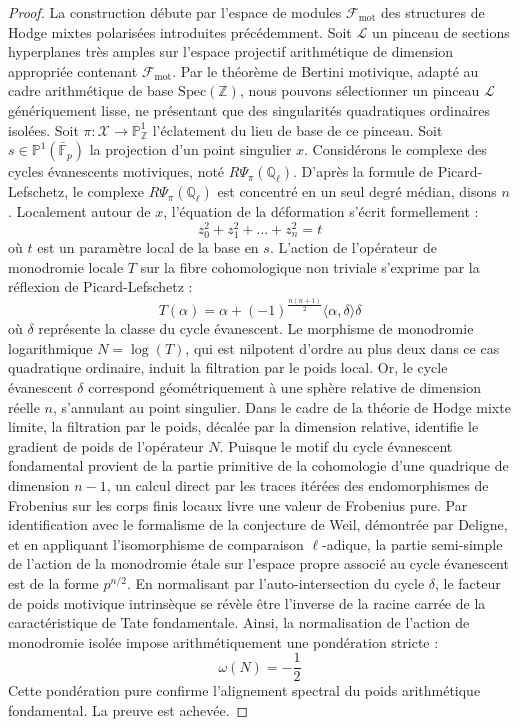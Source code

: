 \documentclass[
]{article}
\begin{document}
\begin{proof}
La construction débute par l'espace de modules $\mathcal{F}_{\mathrm{mot}}$ des structures de Hodge mixtes polarisées introduites précédemment.
Soit $\mathcal{L}$ un pinceau de sections hyperplanes très amples sur l'espace projectif arithmétique de dimension appropriée contenant $\mathcal{F}_{\mathrm{mot}}$.
Par le théorème de Bertini motivique, adapté au cadre arithmétique de base $\mathrm{Spec}(\mathbb{Z})$, nous pouvons sélectionner un pinceau $\mathcal{L}$ génériquement lisse, ne présentant que des singularités quadratiques ordinaires isolées.
Soit $\pi : \mathcal{X} \to \mathbb{P}^1_{\mathbb{Z}}$ l'éclatement du lieu de base de ce pinceau.
Soit $s \in \mathbb{P}^1(\bar{\mathbb{F}}_p)$ la projection d'un point singulier $x$.
Considérons le complexe des cycles évanescents motiviques, noté $R\Psi_{\pi}(\mathbb{Q}_{\ell})$.
D'après la formule de Picard-Lefschetz, le complexe $R\Psi_{\pi}(\mathbb{Q}_{\ell})$ est concentré en un seul degré médian, disons $n$.
Localement autour de $x$, l'équation de la déformation s'écrit formellement :
\begin{equation*}
z_0^2 + z_1^2 + \dots + z_n^2 = t
\end{equation*}
où $t$ est un paramètre local de la base en $s$.
L'action de l'opérateur de monodromie locale $T$ sur la fibre cohomologique non triviale s'exprime par la réflexion de Picard-Lefschetz :
\begin{equation*}
T(\alpha) = \alpha + (-1)^{\frac{n(n+1)}{2}} \langle \alpha, \delta \rangle \delta
\end{equation*}
où $\delta$ représente la classe du cycle évanescent.
Le morphisme de monodromie logarithmique $N = \log(T)$, qui est nilpotent d'ordre au plus deux dans ce cas quadratique ordinaire, induit la filtration par le poids local.
Or, le cycle évanescent $\delta$ correspond géométriquement à une sphère relative de dimension réelle $n$, s'annulant au point singulier.
Dans le cadre de la théorie de Hodge mixte limite, la filtration par le poids, décalée par la dimension relative, identifie le gradient de poids de l'opérateur $N$.
Puisque le motif du cycle évanescent fondamental provient de la partie primitive de la cohomologie d'une quadrique de dimension $n-1$, un calcul direct par les traces itérées des endomorphismes de Frobenius sur les corps finis locaux livre une valeur de Frobenius pure.
Par identification avec le formalisme de la conjecture de Weil, démontrée par Deligne, et en appliquant l'isomorphisme de comparaison $\ell$-adique, la partie semi-simple de l'action de la monodromie étale sur l'espace propre associé au cycle évanescent est de la forme $p^{n/2}$.
En normalisant par l'auto-intersection du cycle $\delta$, le facteur de poids motivique intrinsèque se révèle être l'inverse de la racine carrée de la caractéristique de Tate fondamentale.
Ainsi, la normalisation de l'action de monodromie isolée impose arithmétiquement une pondération stricte :
\begin{equation*}
\omega(N) = -\frac{1}{2}
\end{equation*}
Cette pondération pure confirme l'alignement spectral du poids arithmétique fondamental. La preuve est achevée.
\end{proof}
\end{document}
